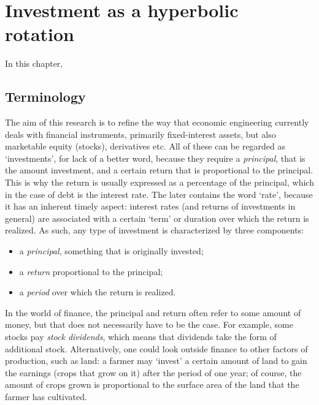 \chapter{Investment as a hyperbolic rotation}
\label{chap:finance_rotation}
In this chapter, 

\section{Terminology}
The aim of this research is to refine the way that economic engineering currently deals with financial instruments, primarily fixed-interest assets, but also marketable equity (stocks), derivatives etc. All of these can be regarded as `investments', for lack of a better word, because they require a \emph{principal}, that is the amount investment, and a certain return that is proportional to the principal. This is why the return is usually expressed as a percentage of the principal, which in the case of debt is the interest rate. The later contains the word `rate', because it has an inherent timely aspect: interest rates (and returns of investments in general) are associated with a certain `term' or duration over which the return is realized. As such, any type of investment is characterized by three components:
\begin{itemize}
    \item a \emph{principal}, something that is originally invested;
    \item a \emph{return} proportional to the principal;
    \item a \emph{period} over which the return is realized.
\end{itemize}
In the world of finance, the principal and return often refer to some amount of money, but that does not necessarily have to be the case. For example, some stocks pay \emph{stock dividends}, which means that dividends take the form of additional stock. Alternatively, one could look outside finance to other factors of production, such as land: a farmer may `invest' a certain amount of land to gain the earnings (crops that grow on it) after the period of one year; of course, the amount of crops grown is proportional to the surface area of the land that the farmer has cultivated.

